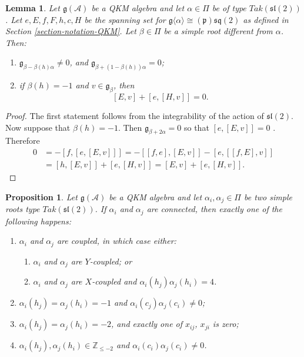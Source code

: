 \documentclass[12pt, a4paper, reqno]{amsart}
\def\p{\mathfrak{p}}
\def\g{\mathfrak{g}}
\def\l{\mathfrak{l}}
\def\s{\mathfrak{s}}
\newtheorem{lemma}{Lemma}
\newtheorem{proposition}{Proposition}
\theoremstyle{definition}
\theoremstyle{definition}
\theoremstyle{definition}
\numberwithin{theorem}{section}
\numberwithin{lemma}{section}
\numberwithin{remark}{section}
\numberwithin{definition}{section}
\numberwithin{corollary}{section}
\numberwithin{proposition}{section}
\numberwithin{example}{section}
\begin{document}
	\begin{lemma}\label{lemma-sq2-rep}
		Let \(\mathfrak{g}(\mathcal{A})\) be a QKM algebra and let \(\alpha \in \Pi\) be of type $Tak(\s\l(2))$. Let \(e,E,f,F,h,c,H\) be the spanning set for $\g\langle\alpha\rangle\cong(\p)\mathfrak{sq}(2)$ as defined in Section \ref{section-notation-QKM}. Let \(\beta \in \Pi\) be a simple root different from \(\alpha\). Then:
		\begin{enumerate}
			\item $\g_{\beta-\beta(h)\alpha}\neq0$, and $\g_{\beta+(1-\beta(h))\alpha}=0$;
			\item  if \(\beta(h)=-1\) and \(v \in \mathfrak{g}_{\beta}\), then 
			\[
			[E,v] + [e,[H,v]] =0.
			\]
		\end{enumerate}
	\end{lemma}
	\begin{proof}
		The first statement follows from the integrability of the action of $\s\l(2)$.  Now suppose that \(\beta(h) = -1\). Then $\g_{\beta+2\alpha}=0$ so that \([e,[E,v]] = 0\) . Therefore
		\begin{align*}
			0 & = -[f,[e,[E,v]]] = -[[f,e],[E,v]] - [e,[[f,E],v]] \\ &
			= [h,[E,v]] + [e,[H,v]] = [E,v] + [e,[H,v]].
		\end{align*}
	\end{proof}
	
	
	
	\begin{proposition}\label{propistion-two-sq2}
		Let \(\mathfrak{g}(\mathcal{A})\) be a QKM algebra and let \(\alpha_i, \alpha_j \in \Pi\) be two simple roots type $Tak(\s\l(2))$. If \(\alpha_i\) and \(\alpha_j\) are connected, then exactly one of the following happens:
		\begin{enumerate}[label=(\roman*)]
			\item $\alpha_i$ and $\alpha_j$ are coupled, in which case either:
			\begin{enumerate}
				\item $\alpha_i$ and $\alpha_j$ are $Y$-coupled; or
				\item $\alpha_i$ and $\alpha_j$ are $X$-coupled and $\alpha_i(h_j)\alpha_j(h_i)=4$.
			\end{enumerate}
			\item \(\alpha_i(h_j) = \alpha_j(h_i) = -1\) and \(\alpha_i(c_j)\alpha_j(c_i) \neq 0\);
			\item \(\alpha_i(h_j)=\alpha_j(h_i) = -2\),  and exactly one of \(x_{ij}\), \(x_{ji}\) is zero;
			\item \(\alpha_i(h_j),\alpha_j(h_i) \in \mathbb{Z}_{\leq -2}\) and \(\alpha_i(c_i)\alpha_j(c_i) \neq 0\).
		\end{enumerate}
	\end{proposition}
	
\end{document}
